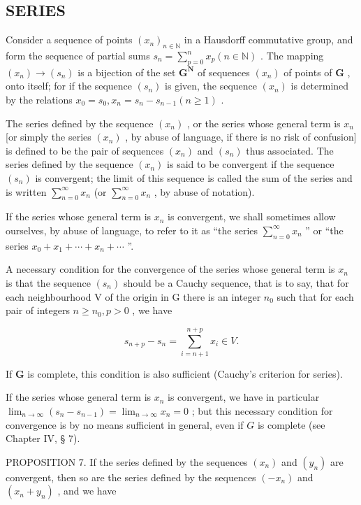\subsection{SERIES}

Consider a sequence of points \((x_{n})_{n\in \mathbb{N}}\) in a Hausdorff commutative group, and form the sequence of partial sums \(s_n = \sum_{p=0}^{n} x_p (n \in \mathbb{N})\) . The mapping \((x_{n}) \to (s_{n})\) is a bijection of the set \(\mathbf{G}^{\mathbf{N}}\) of sequences \((x_{n})\) of points of \(\mathbf{G}\) , onto itself; for if the sequence \((s_{n})\) is given, the sequence \((x_{n})\) is determined by the relations \(x_{0} = s_{0}, x_{n} = s_{n}-s_{n-1} (n \geqslant 1)\) .

The series defined by the sequence \((x_{n})\) , or the series whose general term is \(x_{n}\) {[}or simply the series \((x_{n})\) , by abuse of language, if there is no risk of confusion{]} is defined to be the pair of sequences \((x_{n})\) and \((s_{n})\) thus associated. The series defined by the sequence \((x_{n})\) is said to be convergent if the sequence \((s_n)\) is convergent; the limit of this sequence is called the sum of the series and is written \(\sum_{n=0}^{\infty} x_n\) (or \(\sum_{n=0}^{\infty} x_n\) , by abuse of notation).

If the series whose general term is \(x_{n}\) is convergent, we shall sometimes allow ourselves, by abuse of language, to refer to it as ``the series \(\sum_{n=0}^{\infty} x_{n}\) '' or ``the series \(x_{0} + x_{1} + \cdots + x_{n} + \cdots\) ''.

A necessary condition for the convergence of the series whose general term is \(x_{n}\) is that the sequence \((s_{n})\) should be a Cauchy sequence, that is to say, that for each neighbourhood V of the origin in G there is an integer \(n_{0}\) such that for each pair of integers \(n \geqslant n_{0}, p > 0\) , we have

\[
s _ {n + p} - s _ {n} = \sum_ {i = n + 1} ^ {n + p} x _ {i} \in V.
\]

If \(\mathbf{G}\) is complete, this condition is also sufficient (Cauchy's criterion for series).

If the series whose general term is \(x_{n}\) is convergent, we have in particular \(\lim_{n\to \infty}(s_n - s_{n-1}) = \lim_{n\to \infty}x_n = 0\) ; but this necessary condition for convergence is by no means sufficient in general, even if \(G\) is complete (see Chapter IV, § 7).

PROPOSITION 7. If the series defined by the sequences \((x_{n})\) and \((y_{n})\) are convergent, then so are the series defined by the sequences \((-x_{n})\) and \((x_{n} + y_{n})\) , and we have

